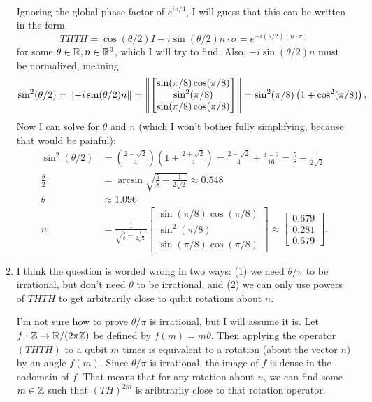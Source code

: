 \documentclass{article}
\begin{document}
\begin{enumerate}[label=(\alph*)]
\begin{align*}
\end{align*}
Ignoring the global phase factor of $e^{i\pi/4}$, I will guess that this can be written in the form
\[ THTH = \cos(\theta/2)I-i\sin(\theta/2) n \cdot \sigma = e^{-i(\theta/2)(n\cdot\pi)} \]
for some $\theta \in \mathbb{R}, n \in \mathbb{R}^3$, which I will try to find. Also, $-i\sin(\theta/2)n$ must be normalized, meaning
\[ \sin^2(\theta/2) = \left\lVert -i\sin(\theta/2)n\right\rVert = \left\lVert \begin{bmatrix}
        \sin(\pi/8)\cos(\pi/8) \\
        \sin^2(\pi/8) \\
        \sin(\pi/8)\cos(\pi/8)
\end{bmatrix}\right\rVert = \sin^2(\pi/8) \left( 1 + \cos^2(\pi/8) \right). \]
Now I can solve for $\theta$ and $n$ (which I won't bother fully simplifying, because that would be painful):
\begin{align*}
    \sin^2(\theta/2) &= \left( \frac{2-\sqrt{2}}{4} \right) \left( 1 + \frac{2+\sqrt{2}}{4} \right) = \frac{2-\sqrt{2}}{4} + \frac{4-2}{16} = \frac{5}{8} - \frac{1}{2\sqrt{2}} \\
    \frac{\theta}{2} &= \arcsin \sqrt{ \frac{5}{8} - \frac{1}{2\sqrt{2}}} \approx 0.548 \\
    \theta &\approx 1.096 \\
    n &= \frac{1}{ \sqrt{\frac{5}{8} - \frac{1}{2\sqrt{2}}}} \begin{bmatrix}
        \sin(\pi/8)\cos(\pi/8) \\
        \sin^2(\pi/8) \\
        \sin(\pi/8)\cos(\pi/8)
        \end{bmatrix} \approx \begin{bmatrix}
            0.679 \\
            0.281 \\
            0.679
        \end{bmatrix}.
\end{align*}
\item I think the question is worded wrong in two ways: (1) we need $\theta/\pi$ to be irrational, but don't need $\theta$ to be irrational, and (2) we can only use powers of $THTH$ to get arbitrarily close to qubit rotations about $n$.
    \par
    I'm not sure how to prove $\theta/\pi$ is irrational, but I will assume it is. Let $f: \mathbb{Z} \rightarrow \mathbb{R}/(2\pi\mathbb{Z})$ be defined by $f(m)=m\theta$. Then applying the operator $(THTH)$ to a qubit $m$ times is equivalent to a rotation (about the vector $n$) by an angle $f(m)$. Since $\theta/\pi$ is irrational, the image of $f$ is dense in the codomain of $f$. That means that for any rotation about $n$, we can find some $m\in \mathbb{Z}$ such that $(TH)^{2m}$ is aribtrarily close to that rotation operator.
\end{enumerate}
\end{document}
